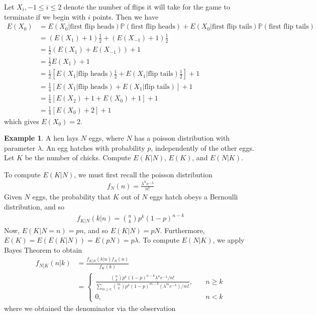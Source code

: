 \documentclass[12pt]{article}
\newcommand{\prob}{\mathbb{P}}
\theoremstyle{plain}
\theoremstyle{definition}
\newtheorem*{example}{Example}
\theoremstyle{remark}
\numberwithin{equation}{section}  %
\begin{document}
Let $X_i, -1 \le i \le 2$ denote the number of flips it will take for the game
to terminate if we begin with $i$ points. Then we have
\begin{align*}
E(X_0) & = E(X_0 | \text{first flip heads})\prob(\text{first flip heads}) +
E(X_0 | \text{first flip tails}) \prob(\text{first flip tails})
\\
& = (E(X_1) + 1) \frac{1}{2} + (E(X_{-1}) + 1) \frac{1}{2}
\\
& = \frac{1}{2}(E(X_1) + E(X_{-1})) + 1
\\
& = \frac{1}{2}E(X_1) + 1
\\
& = \frac{1}{2}[E(X_1 | \text{flip heads}) \frac{1}{2} + E(X_1 | \text{flip
tails}) \frac{1}{2}] + 1
\\
& = \frac{1}{4}[E(X_1 | \text{flip heads}) + E(X_1 | \text{flip
tails})] + 1
\\
& = \frac{1}{4} [ E(X_2) + 1  + E(X_0) + 1] + 1
\\
& = \frac{1}{4}[ E(X_0) + 2] + 1
\end{align*}
which gives $E(X_0) = 2.$
\begin{example}
A hen lays $N$ eggs, where $N$ has a poisson distribution with parameter
$\lambda$. An egg hatches with probability $p$, independently  of the other
eggs. Let $K$ be the number of chicks. Compute $E(K|N)$, $E(K)$, and $E(N | K)$.
\end{example}
To compute $E(K|N)$, we must first recall the poisson distribution
\begin{align*}
f_N(n) = \frac{\lambda^n e^{-\lambda}}{n!}
\end{align*}
Given $N$ eggs, the probability that $K$ out of $N$ eggs hatch obeys a 
Bernoulli distribution, and so 
\begin{align*}
f_{K|N}(k|n) = \binom{n}{k} p^k (1-p)^{n-k}
\end{align*}
Now, $E(K | N = n) = pn$, and so $E(K | N) = pN$. Furthermore, $E(K) = E(E(K
| N	)) = E(pN) = p \lambda$.
To compute $E(N | K)$, we apply Bayes Theorem to obtain
\begin{align*}
f_{N|K}(n|k) & = \frac{f_{K|N}(k|n)f_N(n)}{f_K(k)}
\\
& = \begin{cases}
\frac{\binom{n}{k}p^k (1-p)^{n-k} \lambda^n
e^{-\lambda}/n!}{\sum_{m \ge k}
\binom{m}{k} p^k (1 - p)^{m-k} (\lambda^m e^{-\lambda})/m!}
, \quad & n \ge k
\\
0, \quad & n<k
\end{cases}
\end{align*}
where we obtained the denominator via the observation
\end{document}
